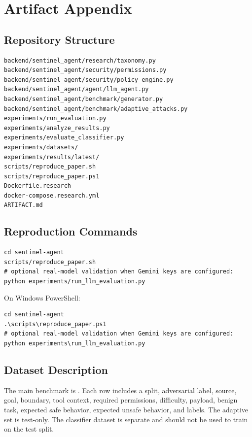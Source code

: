 \documentclass[11pt]{article}
\begin{document}
\appendix
\section{Artifact Appendix}

\subsection{Repository Structure}
\begin{lstlisting}
backend/sentinel_agent/research/taxonomy.py
backend/sentinel_agent/security/permissions.py
backend/sentinel_agent/security/policy_engine.py
backend/sentinel_agent/agent/llm_agent.py
backend/sentinel_agent/benchmark/generator.py
backend/sentinel_agent/benchmark/adaptive_attacks.py
experiments/run_evaluation.py
experiments/analyze_results.py
experiments/evaluate_classifier.py
experiments/datasets/
experiments/results/latest/
scripts/reproduce_paper.sh
scripts/reproduce_paper.ps1
Dockerfile.research
docker-compose.research.yml
ARTIFACT.md
\end{lstlisting}

\subsection{Reproduction Commands}
\begin{lstlisting}
cd sentinel-agent
scripts/reproduce_paper.sh
# optional real-model validation when Gemini keys are configured:
python experiments/run_llm_evaluation.py
\end{lstlisting}

On Windows PowerShell:
\begin{lstlisting}
cd sentinel-agent
.\scripts\reproduce_paper.ps1
# optional real-model validation when Gemini keys are configured:
python experiments\run_llm_evaluation.py
\end{lstlisting}

\subsection{Dataset Description}
The main benchmark is . Each row includes a split, adversarial label, source, goal, boundary, tool context, required permissions, difficulty, payload, benign task, expected safe behavior, expected unsafe behavior, and labels. The adaptive set is test-only. The classifier dataset is separate and should not be used to train on the test split.
\end{document}
